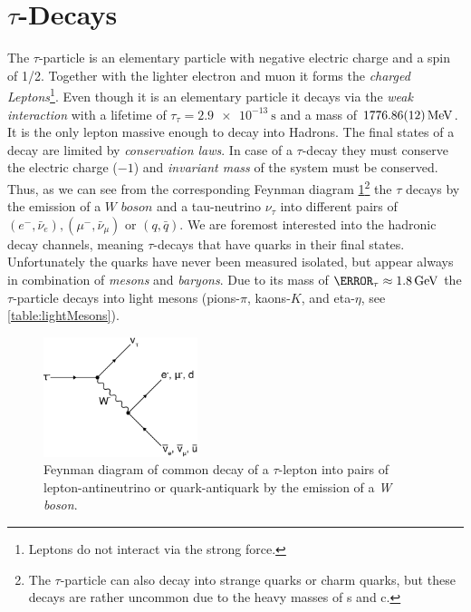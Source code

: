 \documentclass[../../index.tex]{subfiles}
\begin{document}
\section{$\tau$-Decays}
\label{sec:tauDecays}
The $\tau$-particle is an elementary particle with negative electric charge and a
spin of 1/2. Together with the lighter electron and muon it forms the
\textit{charged Leptons}\footnote{Leptons do not interact via the strong force.}.
Even though it is an elementary particle it decays via the \textit{weak
  interaction} with a lifetime of $\tau_\tau=\SI{2.9e-13}{\second}$ and a mass
of $\SI{1776.86\pm0.12}{\mega\electronvolt}$\cite{PDG2018}. It is the only
lepton massive enough to decay into Hadrons.
The final states of a decay are limited by \textit{conservation laws}. In case
of a $\tau$-decay they must conserve the electric charge ($-1$) and
\textit{invariant mass} of the system must be conserved. Thus, as we can see from
the corresponding Feynman diagram
\ref{fig:tauDecay}\footnote{The $\tau$-particle can also decay into strange
  quarks or charm quarks, but these decays are rather uncommon due to the heavy
  masses of s and c.} the $\tau$ decays by the emission of a $\textit{W boson}$
and a tau-neutrino $\nu_\tau$ into different pairs of $(e^-, \bar\nu_e), (\mu^-,
\bar\nu_\mu)$ or $(q, \bar q)$.
We are foremost interested into the hadronic decay channels, meaning
$\tau$-decays that have quarks in their final states. Unfortunately the quarks
have never been measured isolated, but appear always in combination of \textit{mesons}
and \textit{baryons}. Due to its mass of $\m_\tau \approx
\SI{1.8}{\giga\electronvolt}$ the $\tau$-particle decays into light mesons
(pions-$\pi$, kaons-$K$, and eta-$\eta$, see \ref{table:lightMesons}).
\begin{figure}[h]
  \label{fig:tauDecay}
  \centering
  \includegraphics[width=0.4\textwidth]{images/tauDecay.eps}
  \caption{Feynman diagram of common decay of a $\tau$-lepton into pairs of
    lepton-antineutrino or quark-antiquark by the emission of a \textit{W boson}.}
\end{figure}
\end{document}
